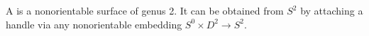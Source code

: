 A  is a nonorientable surface of genus 2. It can be obtained from $S^2$ by attaching a handle via any nonorientable embedding $S^0 \times D^2 \to S^2$.
